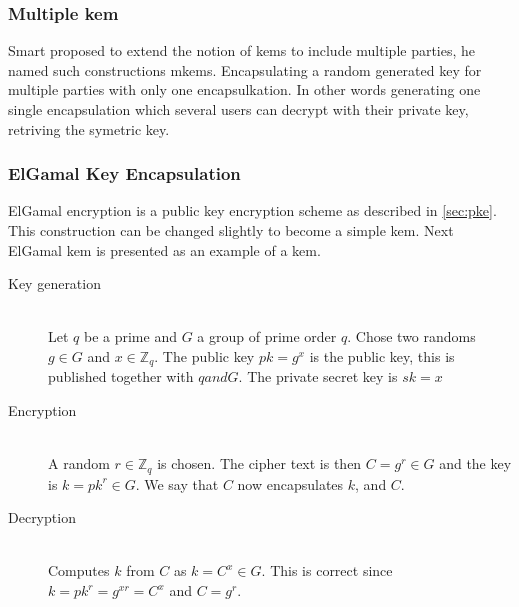 \subsubsection{Multiple \gls{kem}}\label{mkem}
Smart \cite{mkem} proposed to extend the notion of \glspl{kem} to include multiple parties, he named such constructions m\Glspl{kem}. Encapsulating a random generated key for multiple parties with only one encapsulkation. In other words generating one single encapsulation which several users can decrypt with their private key, retriving the symetric key.


\subsubsection{ElGamal Key Encapsulation \cite{elgamal-kem}}\label{subsubsec:elgamal}
ElGamal encryption is a public key encryption scheme as described in \ref{sec:pke}. This construction can be changed slightly to become a simple \gls{kem}. Next ElGamal \gls{kem} is presented as an example of a \gls{kem}.
\begin{description}
\item[Key generation]\hfill \\
Let $q$ be a prime and $G$ a group of prime order $q$. Chose two randoms $g \in G$ and $x \in \mathbb{Z}_q$. The public key $pk = g^x$ is the public key, this is published together with $q and G$. The private secret key is $sk = x$ 
\item[Encryption]\hfill \\
A random $r \in \mathbb{Z}_q$ is chosen. The cipher text is then $C = g^r \in G$ and the key is $k = pk^r \in G$. We say that $C$ now encapsulates $k$, and $C$.
\item[Decryption]\hfill \\
Computes $k$ from $C$ as $k = C^x \in G$. This is correct since \\$k = pk^r = g^{xr} = C^x$ and $ C = g^r$.
\end{description}






